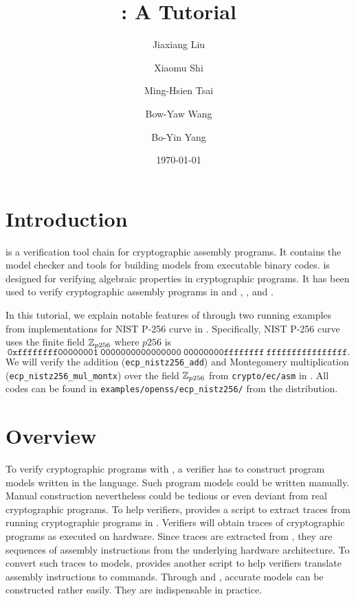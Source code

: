 \documentclass{amsproc}
\begin{document}
\title{\cryptoline: A Tutorial}
\author{Jiaxiang Liu}
\author{Xiaomu Shi}
\author{Ming-Hsien Tsai}
\author{Bow-Yaw Wang}
\author{Bo-Yin Yang}
\date{\today}
\maketitle

\section{Introduction}

\cryptoline is a verification tool chain for cryptographic assembly
programs. It contains the \cryptoline model checker and tools for
building models from executable binary codes. \cryptoline is designed
for verifying algebraic properties in cryptographic programs. It has
been used to verify cryptographic assembly programs in \openssl and
\blst, \pqclean, and \pqmfour.

In this tutorial, we explain notable features of \cryptoline through
two running examples from \xeightysix implementations for NIST P-256 curve
in \openssl. Specifically, NIST P-256 curve uses the finite field
$\mathbb{Z}_{p256}$ where $p256$ is
\[
\mathtt{0xffffffff00000001\ 0000000000000000\ 00000000ffffffff\ 
   ffffffffffffffff}.
\]
We will verify the addition (\texttt{ecp\_nistz256\_add})
and Montegomery multiplication (\texttt{ecp\_nistz256\_mul\_montx})
over the field $\mathbb{Z}_{p256}$ from \texttt{crypto/ec/asm} in \openssl.
All \cryptoline codes can be found in
\texttt{examples/openss/ecp\_nistz256/\xeightysix} from the \cryptoline
distribution. 

\section{\cryptoline Overview}

To verify cryptographic programs with \cryptoline, a verifier has to
construct program models written in the \cryptoline language. Such
program models could be written manually. Manual construction
nevertheless could be tedious or even deviant from real cryptographic
programs. To help verifiers, \cryptoline provides a \python script
\itrace to extract traces from running cryptographic
programs in \gdb. Verifiers will obtain traces of cryptographic 
programs as executed on hardware. Since traces are extracted from
\gdb, they are sequences of assembly instructions from the underlying
hardware architecture. To convert such traces to \cryptoline models,
\cryptoline provides another \python script \tozdsl to
help verifiers translate assembly instructions to \cryptoline
commands. Through \itrace and \tozdsl, accurate \cryptoline models can
be constructed rather easily. They are indispensable in practice.
\end{document}
